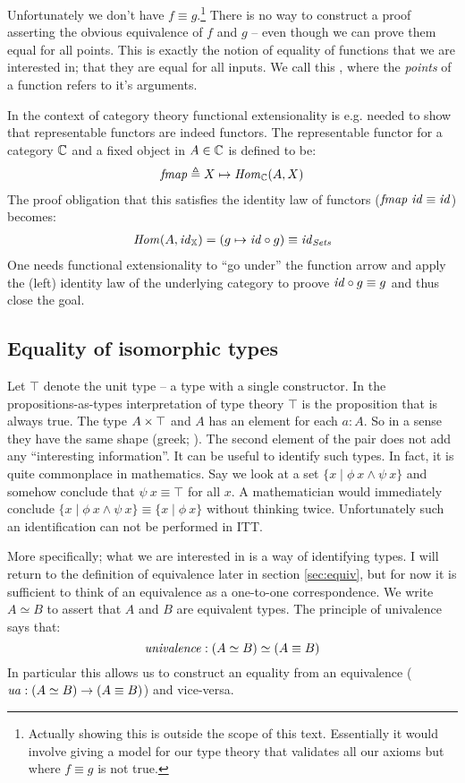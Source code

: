 Unfortunately we don't have $f \equiv g$.\footnote{Actually showing this is
outside the scope of this text. Essentially it would involve giving a model
for our type theory that validates all our axioms but where $f \equiv g$ is
not true.} There is no way to construct a proof asserting the obvious
equivalence of $f$ and $g$ -- even though we can prove them equal for all
points. This is exactly the notion of equality of functions that we are
interested in; that they are equal for all inputs. We call this
, where the \emph{points} of a function refers
to it's arguments.

In the context of category theory functional extensionality is e.g. needed to
show that representable functors are indeed functors. The representable functor
for a category $\mathbb{C}$ and a fixed object in $A \in \mathbb{C}$ is defined to be:
%
\begin{align*}
\mathit{fmap} \mathrel{\triangleq} X \mapsto \mathit{Hom}_{\mathbb{C}}(A, X)
\end{align*}
%
The proof obligation that this satisfies the identity law of functors
($\mathit{fmap}\ \mathit{id} \equiv \mathit{id}$) becomes:
%
\begin{align*}
\mathit{Hom}(A, \mathit{id}_{\mathbb{X}}) = (g \mapsto \mathit{id} \circ g) \equiv \mathit{id}_{\mathit{Sets}}
\end{align*}
%
One needs functional extensionality to ``go under'' the function arrow and apply
the (left) identity law of the underlying category to proove $\mathit{id} \circ g
\equiv g$ and thus close the goal.
%
\subsection{Equality of isomorphic types}
%
Let $\top$ denote the unit type -- a type with a single constructor. In the
propositions-as-types interpretation of type theory $\top$ is the proposition
that is always true. The type $A \times \top$ and $A$ has an element for each $a :
A$. So in a sense they have the same shape (greek; ). The
second element of the pair does not add any ``interesting information''. It can
be useful to identify such types. In fact, it is quite commonplace in
mathematics. Say we look at a set $\{x \mid \phi\ x \land \psi\ x\}$ and somehow
conclude that $\psi\ x \equiv \top$ for all $x$. A mathematician would
immediately conclude $\{x \mid \phi\ x \land \psi\ x\} \equiv \{x \mid
\phi\ x\}$ without thinking twice. Unfortunately such an identification can not
be performed in ITT.

More specifically; what we are interested in is a way of identifying
 types. I will return to the definition of equivalence later
in section \ref{sec:equiv}, but for now it is sufficient to think of an
equivalence as a one-to-one correspondence. We write $A \simeq B$ to assert that
$A$ and $B$ are equivalent types. The principle of univalence says that:
%
$$\mathit{univalence} \mathrel{:} (A \simeq B) \simeq (A \equiv B)$$
%
In particular this allows us to construct an equality from an equivalence
($\mathit{ua} \mathrel{:} (A \simeq B) \to (A \equiv B)$) and vice-versa.

